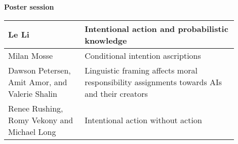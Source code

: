 \documentclass[11pt]{article}
\begin{document}
\vspace{2cm}

\textbf{Poster session\\[5pt]			}				

\begin{tabular}{ p{0.3\linewidth} p{0.6\linewidth}}
Le Li 
& Intentional action and probabilistic knowledge \\
\hline
Milan Mosse
& Conditional intention ascriptions \\
\hline
Dawson Petersen, Amit Amor, and Valerie Shalin
& Linguistic framing affects moral responsibility assignments towards AIs and their creators \\
\hline
Renee Rushing, Romy Vekony and Michael Long
& Intentional action without action \\
\end{tabular}
\end{document}
